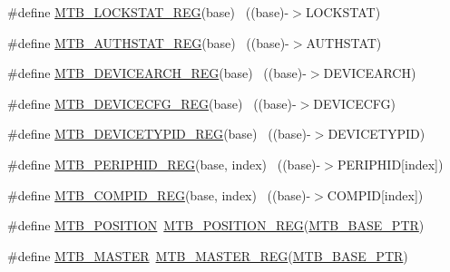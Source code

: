 \begin{DoxyCompactItemize}
\item 
\#define \hyperlink{group___m_t_b___register___accessor___macros_ga7a6b7214439d9309e60ef1c130eb5624}{M\+T\+B\+\_\+\+L\+O\+C\+K\+S\+T\+A\+T\+\_\+\+R\+EG}(base)                                  ~((base)-\/$>$L\+O\+C\+K\+S\+T\+AT)
\item 
\#define \hyperlink{group___m_t_b___register___accessor___macros_ga589d384dfb47772beaa66d10ea28a5e4}{M\+T\+B\+\_\+\+A\+U\+T\+H\+S\+T\+A\+T\+\_\+\+R\+EG}(base)                                  ~((base)-\/$>$A\+U\+T\+H\+S\+T\+AT)
\item 
\#define \hyperlink{group___m_t_b___register___accessor___macros_gacbb6c352d25d7cb7f695ac7741ae78f0}{M\+T\+B\+\_\+\+D\+E\+V\+I\+C\+E\+A\+R\+C\+H\+\_\+\+R\+EG}(base)                              ~((base)-\/$>$D\+E\+V\+I\+C\+E\+A\+R\+CH)
\item 
\#define \hyperlink{group___m_t_b___register___accessor___macros_ga0aea42961121417709e9aa7625216071}{M\+T\+B\+\_\+\+D\+E\+V\+I\+C\+E\+C\+F\+G\+\_\+\+R\+EG}(base)                                ~((base)-\/$>$D\+E\+V\+I\+C\+E\+C\+FG)
\item 
\#define \hyperlink{group___m_t_b___register___accessor___macros_gacbe9bf97189a4f6f2b4816c957e4bbf3}{M\+T\+B\+\_\+\+D\+E\+V\+I\+C\+E\+T\+Y\+P\+I\+D\+\_\+\+R\+EG}(base)                            ~((base)-\/$>$D\+E\+V\+I\+C\+E\+T\+Y\+P\+ID)
\item 
\#define \hyperlink{group___m_t_b___register___accessor___macros_gafcffdf38c49f6e8fafa6d701a8cc3109}{M\+T\+B\+\_\+\+P\+E\+R\+I\+P\+H\+I\+D\+\_\+\+R\+EG}(base,  index)                      ~((base)-\/$>$P\+E\+R\+I\+P\+H\+ID\mbox{[}index\mbox{]})
\item 
\#define \hyperlink{group___m_t_b___register___accessor___macros_ga52410b03c889a62143894894543baf6e}{M\+T\+B\+\_\+\+C\+O\+M\+P\+I\+D\+\_\+\+R\+EG}(base,  index)                          ~((base)-\/$>$C\+O\+M\+P\+ID\mbox{[}index\mbox{]})
\item 
\#define \hyperlink{group___m_t_b___register___accessor___macros_ga2356017c5dd8a963f2566b41cdb0e2ea}{M\+T\+B\+\_\+\+P\+O\+S\+I\+T\+I\+ON}~\hyperlink{group___m_t_b___register___accessor___macros_gad0d320e804f2cd189bb8188e5c78eb8d}{M\+T\+B\+\_\+\+P\+O\+S\+I\+T\+I\+O\+N\+\_\+\+R\+EG}(\hyperlink{group___m_t_b___peripheral_gadf7f362dfa67354951e6a23ddf08cd73}{M\+T\+B\+\_\+\+B\+A\+S\+E\+\_\+\+P\+TR})
\item 
\#define \hyperlink{group___m_t_b___register___accessor___macros_ga8790f019f8279bebf92068c9f295280f}{M\+T\+B\+\_\+\+M\+A\+S\+T\+ER}~\hyperlink{group___m_t_b___register___accessor___macros_ga93dc6f817f5ffb588f1ecbc8bcba05f7}{M\+T\+B\+\_\+\+M\+A\+S\+T\+E\+R\+\_\+\+R\+EG}(\hyperlink{group___m_t_b___peripheral_gadf7f362dfa67354951e6a23ddf08cd73}{M\+T\+B\+\_\+\+B\+A\+S\+E\+\_\+\+P\+TR})

\end{DoxyCompactItemize}
